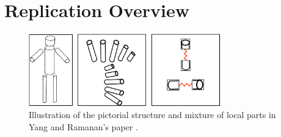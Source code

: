 \documentclass[10pt,twocolumn,letterpaper]{article}
\begin{document}
\section{Replication Overview}
\begin{figure}[t]
  \centering
  \includegraphics[width=8.3cm]{figure/pictorial.png}
  \caption{Illustration of the pictorial structure and mixture of local parts in Yang and Ramanan's paper \cite{Yang_PAMI2011}.}
\label{fig:pictorial}
\end{figure}
\end{document}
